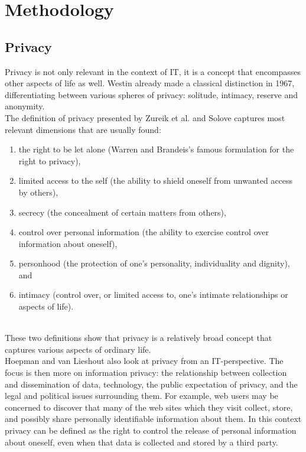 \section{Methodology}
\label{sec:methodology}
	
\subsection{Privacy}	
Privacy is not only relevant in the context of IT, it is a concept that encompasses other aspects of life as well.
Westin \cite{westin1968privacy} already made a classical distinction in 1967, differentiating between various spheres of privacy: solitude, intimacy, reserve and anonymity.\\

The definition of privacy presented by Zureik et al. \cite{privacydimensions} and Solove \cite{solove2002conceptualizing} captures most relevant dimensions that are usually found:
\begin{enumerate}
	\item the right to be let alone (Warren and Brandeis's \cite{warren1890right} famous formulation for the right to privacy),
	\item limited access to the self (the ability to shield oneself from unwanted access by others), 
	\item secrecy (the concealment of certain matters from others),
	\item control over personal information (the ability to exercise control over information about oneself), 
	\item personhood (the protection of one's personality, individuality and dignity), and 
	\item intimacy (control over, or limited access to, one's intimate relationships or aspects of life).
\end{enumerate} 
~\\
These two definitions show that privacy is a relatively broad concept that captures various aspects of ordinary life.\\

Hoepman and van Lieshout \cite{privacy} also look at privacy from an IT-perspective. The focus is then more on information privacy: the relationship between collection and dissemination of data, technology, the public expectation of privacy, and the legal and political issues surrounding them. For example, web users may be concerned to discover that many of the web sites which they visit collect, store, and possibly share personally identifiable information about them. In this context privacy can be defined as the right to control the release of personal information about oneself, even when that data is collected and stored by a third party.\\

